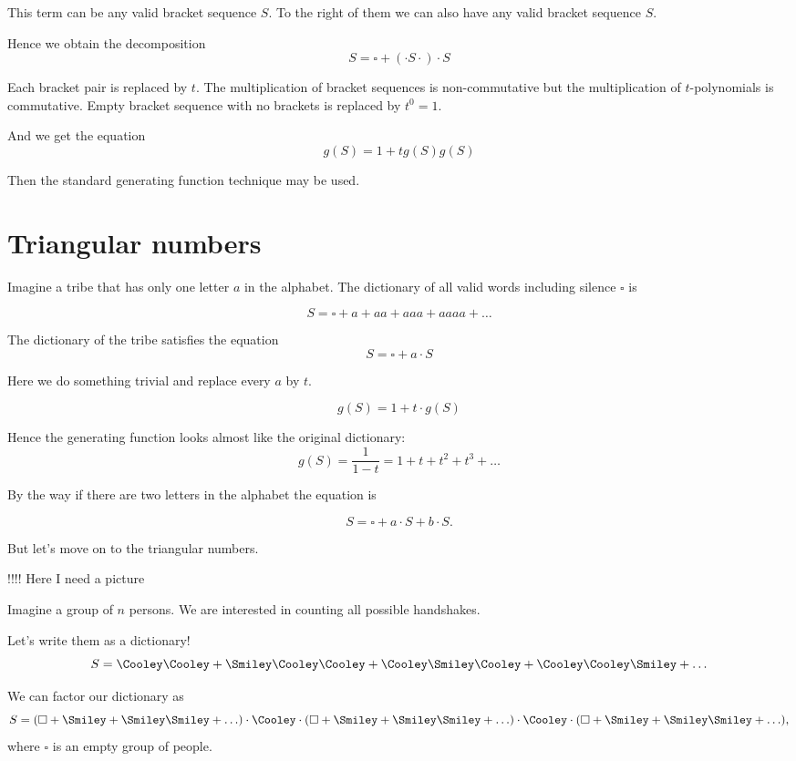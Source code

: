 \documentclass{article}
\newcommand{\friend}{\Cooley}
\newcommand{\unfriend}{\Smiley}
\begin{document}
This term can be any valid bracket sequence $S$. 
To the right of them we can also have any valid bracket sequence $S$. 

Hence we obtain the decomposition 
\[
S = \square + (\cdot S \cdot )\cdot S
\]

Each bracket pair is replaced by $t$. 
The multiplication of bracket sequences is non-commutative but the multiplication of $t$-polynomials is commutative. 
Empty bracket sequence with no brackets is replaced by $t^0 = 1$.

And we get the equation 
\[
g(S) = 1 + 	t g(S) g(S)
\]

Then the standard generating function technique may be used. 


\section{Triangular numbers}


Imagine a tribe that has only one letter $a$ in the alphabet. 
The dictionary of all valid words including silence $\square$ is

\[
S = \square + a + aa + aaa + aaaa + \ldots	
\]

The dictionary of the tribe satisfies the equation
\[
S = \square + a \cdot S	
\]

Here we do something trivial and replace every $a$ by $t$.

\[
g(S) = 1 + t \cdot g(S)
\]

Hence the generating function looks almost like the original dictionary:
\[
g(S) = \frac{1}{1-t} = 1 + t + t^2 + t^3 + \ldots	
\]


By the way if there are two letters in the alphabet the equation is 

\[
S = \square + a \cdot S + b \cdot S.
\]

But let's move on to the triangular numbers. 


!!!! Here I need a picture


Imagine a group of $n$ persons. 
We are interested in counting all possible handshakes.

Let's write them as a dictionary!
\[
S = \friend\friend + \unfriend\friend\friend + \friend\unfriend\friend + \friend\friend\unfriend + \ldots
\]

We can factor our dictionary as
\[
S = (\square + \unfriend + \unfriend\unfriend + \ldots) \cdot \friend \cdot (\square + \unfriend + \unfriend\unfriend + \ldots) \cdot \friend \cdot (\square + \unfriend + \unfriend\unfriend + \ldots),  	
\]
where $\square$ is an empty group of people.
\end{document}
